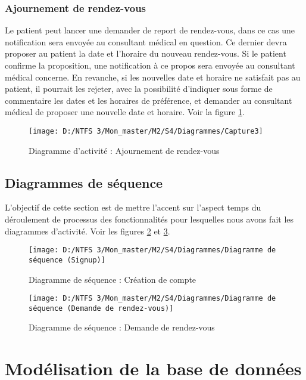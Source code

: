 \subsubsection{Ajournement de rendez-vous}
Le patient peut lancer une demander de report de rendez-vous, dans ce cas une notification sera envoyée au consultant médical en question. Ce dernier devra proposer au patient la date et l'horaire du nouveau rendez-vous. Si le patient confirme la proposition, une notification à ce propos sera envoyée au consultant médical concerne. En revanche, si les nouvelles date et horaire ne satisfait pas au patient, il pourrait les rejeter, avec la possibilité d’indiquer sous forme de commentaire les dates et les horaires de préférence, et demander au consultant médical de proposer une nouvelle date et horaire. Voir la figure \ref{Figure 4.6}.
\begin{figure}[!h]
	\texttt{[image: D:/NTFS 3/Mon\_master/M2/S4/Diagrammes/Capture3]}
	\centering
	\caption{Diagramme d'activité : Ajournement de rendez-vous}
	\label{Figure 4.6}
\end{figure}

\subsection{Diagrammes de séquence}
L'objectif de cette section est de mettre l'accent sur l’aspect temps du déroulement de processus des fonctionnalités pour lesquelles nous avons fait les diagrammes d’activité. Voir les figures \ref{Figure 4.7} et \ref{Figure 4.8}.
\begin{figure}[h]
	\texttt{[image: D:/NTFS 3/Mon\_master/M2/S4/Diagrammes/Diagramme de séquence (Signup)]}
	\centering
	\caption{Diagramme de séquence : Création de compte}
	\label{Figure 4.7}
\end{figure}
\begin{figure}[h]
	\texttt{[image: D:/NTFS 3/Mon\_master/M2/S4/Diagrammes/Diagramme de séquence (Demande de rendez-vous)]}
	\centering
	\caption{Diagramme de séquence : Demande de rendez-vous}
	\label{Figure 4.8}
\end{figure}

\section{Modélisation de la base de données}
